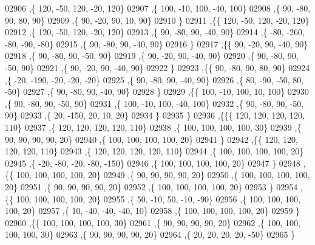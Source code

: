 \begin{DoxyCode}
02906     ,\{   120,   -50,   120,   -20,   120\}
02907     ,\{   100,   -10,   100,   -40,   100\}
02908     ,\{    90,   -80,    90,    80,    90\}
02909     ,\{    90,   -20,    90,    10,    90\}
02910     \}
02911    ,\{\{   120,   -50,   120,   -20,   120\}
02912     ,\{   120,   -50,   120,   -20,   120\}
02913     ,\{    90,   -80,    90,   -40,    90\}
02914     ,\{   -80,  -260,   -80,   -90,   -80\}
02915     ,\{    90,   -80,    90,   -40,    90\}
02916     \}
02917    ,\{\{    90,   -20,    90,   -40,    90\}
02918     ,\{    90,   -80,    90,   -50,    90\}
02919     ,\{    90,   -20,    90,   -40,    90\}
02920     ,\{    90,   -80,    90,   -50,    90\}
02921     ,\{    90,   -20,    90,   -40,    90\}
02922     \}
02923    ,\{\{    90,   -80,    90,    80,    90\}
02924     ,\{   -20,  -190,   -20,   -20,   -20\}
02925     ,\{    90,   -80,    90,   -40,    90\}
02926     ,\{    80,   -90,   -50,    80,   -50\}
02927     ,\{    90,   -80,    90,   -40,    90\}
02928     \}
02929    ,\{\{   100,   -10,   100,    10,   100\}
02930     ,\{    90,   -80,    90,   -50,    90\}
02931     ,\{   100,   -10,   100,   -40,   100\}
02932     ,\{    90,   -80,    90,   -50,    90\}
02933     ,\{    20,  -150,    20,    10,    20\}
02934     \}
02935    \}
02936   ,\{\{\{   120,   120,   120,   120,   110\}
02937     ,\{   120,   120,   120,   120,   110\}
02938     ,\{   100,   100,   100,   100,    30\}
02939     ,\{    90,    90,    90,    90,    20\}
02940     ,\{   100,   100,   100,   100,    20\}
02941     \}
02942    ,\{\{   120,   120,   120,   120,   110\}
02943     ,\{   120,   120,   120,   120,   110\}
02944     ,\{   100,   100,   100,   100,    20\}
02945     ,\{   -20,   -80,   -20,   -80,  -150\}
02946     ,\{   100,   100,   100,   100,    20\}
02947     \}
02948    ,\{\{   100,   100,   100,   100,    20\}
02949     ,\{    90,    90,    90,    90,    20\}
02950     ,\{   100,   100,   100,   100,    20\}
02951     ,\{    90,    90,    90,    90,    20\}
02952     ,\{   100,   100,   100,   100,    20\}
02953     \}
02954    ,\{\{   100,   100,   100,   100,    20\}
02955     ,\{    50,   -10,    50,   -10,   -90\}
02956     ,\{   100,   100,   100,   100,    20\}
02957     ,\{    10,   -40,   -40,   -40,    10\}
02958     ,\{   100,   100,   100,   100,    20\}
02959     \}
02960    ,\{\{   100,   100,   100,   100,    30\}
02961     ,\{    90,    90,    90,    90,    20\}
02962     ,\{   100,   100,   100,   100,    30\}
02963     ,\{    90,    90,    90,    90,    20\}
02964     ,\{    20,    20,    20,    20,   -50\}
02965     \}

\end{DoxyCode}
